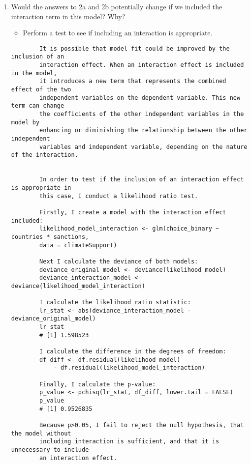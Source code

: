 \documentclass[12pt,letterpaper]{article}
\begin{document}
\begin{enumerate}
\begin{enumerate}
\begin{verbatim}
		\end{verbatim}		
		
		\item
		Would the answers to 2a and 2b potentially change if we included the interaction term in this model? Why? 
		\begin{itemize}
			\item Perform a test to see if including an interaction is appropriate.
		\end{itemize}
	
		\begin{verbatim}	
		It is possible that model fit could be improved by the inclusion of an
		interaction effect. When an interaction effect is included in the model,
		it introduces a new term that represents the combined effect of the two
		independent variables on the dependent variable. This new term can change
		the coefficients of the other independent variables in the model by
		enhancing or diminishing the relationship between the other independent
		variables and independent variable, depending on the nature of the interaction.
		
	
		In order to test if the inclusion of an interaction effect is appropriate in
		this case, I conduct a likelihood ratio test.
		
		Firstly, I create a model with the interaction effect included:
		likelihood_model_interaction <- glm(choice_binary ~ countries * sanctions,
		data = climateSupport)
		
		Next I calculate the deviance of both models:
		deviance_original_model <- deviance(likelihood_model)
		deviance_interaction_model <- deviance(likelihood_model_interaction)
		
		I calculate the likelihood ratio statistic:
		lr_stat <- abs(deviance_interaction_model - deviance_original_model)
		lr_stat
		# [1] 1.598523
		
		I calculate the difference in the degrees of freedom:
		df_diff <- df.residual(likelihood_model)
			- df.residual(likelihood_model_interaction)
		
		Finally, I calculate the p-value:
		p_value <- pchisq(lr_stat, df_diff, lower.tail = FALSE)
		p_value
		# [1] 0.9526835
		
		Because p>0.05, I fail to reject the null hypothesis, that the model without
		including interaction is sufficient, and that it is unnecessary to include
		an interaction effect.
		
	\end{verbatim}		
	
	\end{enumerate}
	\end{enumerate}
\end{document}
